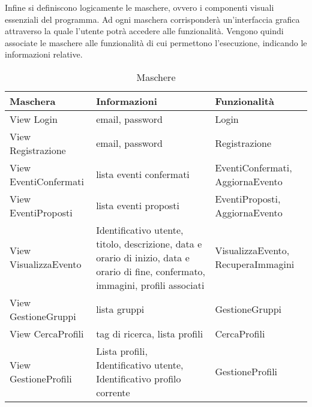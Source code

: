 Infine si definiscono logicamente le maschere, ovvero i componenti visuali essenziali del programma.
Ad ogni maschera corrisponderà un'interfaccia grafica 
attraverso la quale l'utente potrà accedere alle funzionalità.
Vengono quindi associate le maschere alle funzionalità di cui permettono l'esecuzione, 
indicando le informazioni relative.\\

\begin{table}[htbp]
    \centering
\begin{tabular} {|P{4.5cm}|P{6.5cm}|P{4cm}|}
    \hline
    \textbf{Maschera}     & \textbf{Informazioni}                                                                                                              & \textbf{Funzionalità}              \\
    \hline
    View Login            & email, password                                                                                                                    & Login                              \\
    \hline
    View Registrazione    & email, password                                                                                                                    & Registrazione                      \\
    \hline
    View EventiConfermati & lista eventi confermati                                                                                                            & EventiConfermati, AggiornaEvento   \\
    \hline
    View EventiProposti   & lista eventi proposti                                                                                                              & EventiProposti, \linebreak AggiornaEvento     \\
    \hline
    View VisualizzaEvento & Identificativo utente, titolo, descrizione, data e orario di inizio, data e orario di fine, confermato, immagini, profili associati & VisualizzaEvento, RecuperaImmagini \\
    \hline
    View GestioneGruppi   & lista gruppi                                                                                                                       & GestioneGruppi                     \\
    \hline
    View CercaProfili     & tag di ricerca, lista profili                                                                                                      & CercaProfili                       \\
    \hline
    View GestioneProfili  & Lista profili, Identificativo utente, Identificativo profilo corrente                                                              & GestioneProfili                    \\
    \hline
\end{tabular}
\caption{Maschere}
\end{table}

